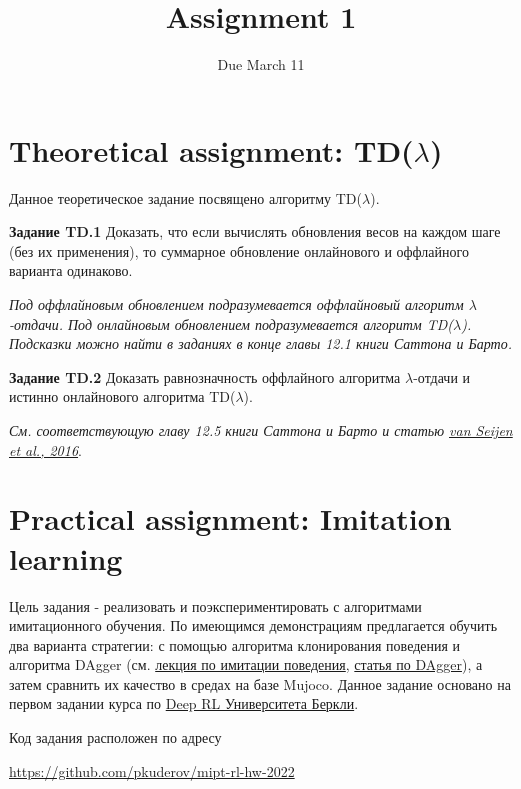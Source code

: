 \documentclass[12pt, oneside]{article}
\author{Due March 11}
\title{Assignment 1}
\date{}
\begin{document}
\maketitle
\thispagestyle{fancy}

\section{Theoretical assignment: TD($\lambda$)}

Данное теоретическое задание посвящено алгоритму TD($\lambda$).

\textbf{Задание TD.1} Доказать, что если вычислять обновления весов на каждом шаге (без их применения), то суммарное обновление онлайнового и оффлайного варианта одинаково.

\textit{Под оффлайновым обновлением подразумевается оффлайновый алгоритм $\lambda$-отдачи. Под онлайновым обновлением подразумевается алгоритм TD($\lambda$). Подсказки можно найти в заданиях в конце главы 12.1 книги Саттона и Барто.}

\textbf{Задание TD.2} Доказать равнозначность оффлайного алгоритма $\lambda$-отдачи и истинно онлайнового алгоритма TD($\lambda$).

\textit{См. соответствующую главу 12.5 книги Саттона и Барто и статью \href{https://www.jmlr.org/papers/volume17/15-599/15-599.pdf}{van Seijen et al., 2016}}.

\section{Practical assignment: Imitation learning}

Цель задания - реализовать и поэкспериментировать с алгоритмами имитационного обучения. По имеющимся демонстрациям предлагается обучить два варианта стратегии: с помощью алгоритма клонирования поведения и алгоритма DAgger (см. \href{https://youtu.be/HUzyjOsd2PA?list=PL_iWQOsE6TfURIIhCrlt-wj9ByIVpbfGc}{лекция по имитации поведения}, \href{http://proceedings.mlr.press/v15/ross11a/ross11a.pdf}{статья по DAgger}), а затем сравнить их качество в средах на базе Mujoco. Данное задание основано на первом задании курса по \href{http://rail.eecs.berkeley.edu/deeprlcourse/}{Deep RL Университета Беркли}.

Код задания расположен по адресу
\begin{center}
    \href{https://github.com/pkuderov/mipt-rl-hw-2022}{https://github.com/pkuderov/mipt-rl-hw-2022}
\end{center}
\end{document}

